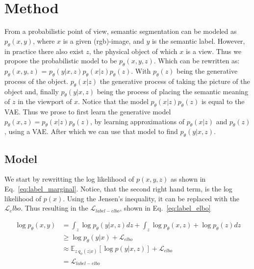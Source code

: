 \chapter{Method}\label{chapter:first_real_chapter}
From a probabilistic point of view, semantic segmentation can be modeled as $p_\theta(x,y)$, where $x$ is a given (rgb)-image, and $y$ is the semantic label. However, in practice there also exist $z$, the physical object of which $x$ is a view. Thus we propose the probabilistic model to be $p_\theta(x,y,z)$. Which can be rewritten as: $p_\theta(x,y,z)$ = $p_\theta(y|x,z) p_\theta(x|z) p_\theta(z)$. With $p_\theta(z)$ being the generative process of the object. $p_\theta(x|z)$ the generative process of taking the picture of the object and, finally $p_\theta(y|x,z)$ being the process of placing the semantic meaning of $z$ in the viewport of $x$. Notice that the model $p_\theta(x|z) p_\theta(z)$ is equal to the VAE. Thus we prose to first learn the generative model $p_\theta(x,z) = p_\theta(x|z) p_\theta(z)$, by learning approximations of $p_\theta(x|z)$ and $p_\theta(z)$, using a VAE. After which we can use that model to find $p_\theta(y|x,z)$.

\section{Model}
We start by rewritting the log likelihood of $p(x, y, z)$ as shown in Eq.~\ref{eq:label_marginal}. Notice, that the second right hand term, is the log likelihood of $p(x)$. Using the Jensen's inequality, it can be replaced with the $\mathcal{L}_elbo$. Thus resulting in the $\mathcal{L}_{label-elbo}$, shown in Eq.~\ref{eq:label_elbo}

\begin{subequations}
    \begin{align}
        \log p_\theta(x, y) & = \int_z \log p_\theta(y | x, z) dz +  \int_z \log p_\theta(x, z) + \log p_\theta(z) dz             \label{eq:label_marginal} \\
                            & \geq \log p_\theta(y | x) + \mathcal{L}_{elbo}                                                                                \\
                            & \approx \mathbb{E}_{z~q_{\phi}(z | x)}[\log p(y|x, z)] + \mathcal{L}_{elbo}                                                   \\
                            & = \mathcal{L}_{label-elbo} \label{eq:label_elbo}
    \end{align}
\end{subequations}

